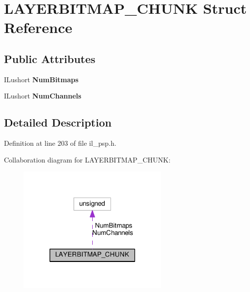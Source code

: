 \hypertarget{structLAYERBITMAP__CHUNK}{}\section{L\+A\+Y\+E\+R\+B\+I\+T\+M\+A\+P\+\_\+\+C\+H\+U\+NK Struct Reference}
\label{structLAYERBITMAP__CHUNK}
\subsection*{Public Attributes}
\begin{DoxyCompactItemize}
\item 
\mbox{\label{structLAYERBITMAP__CHUNK_a0558d6a4106b7bfdaecba00e9f35c7ec}} 
I\+Lushort {\bfseries Num\+Bitmaps}
\item 
\mbox{\label{structLAYERBITMAP__CHUNK_ad3c0917d59ce88b1a335929a0397b483}} 
I\+Lushort {\bfseries Num\+Channels}
\end{DoxyCompactItemize}


\subsection{Detailed Description}


Definition at line 203 of file il\+\_\+psp.\+h.



Collaboration diagram for L\+A\+Y\+E\+R\+B\+I\+T\+M\+A\+P\+\_\+\+C\+H\+U\+NK\+:
\nopagebreak
\begin{figure}[H]
\begin{center}
\leavevmode
\includegraphics[width=209pt]{de/d7f/structLAYERBITMAP__CHUNK__coll__graph}
\end{center}
\end{figure}


